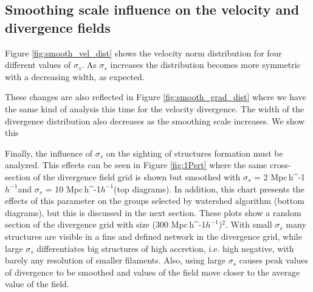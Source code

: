 \documentclass[usenatbib]{mnras}
\newcommand{\Mpch}{\,{\rm Mpc}\,\ifmmode h^{-1}\else $h^{-1}$\fi}
\begin{document}
\subsection{Smoothing scale influence on the velocity and divergence fields}
\label{VDF effects}

Figure \ref{fig:smooth_vel_dist} shows the velocity norm distribution
for four different values of $\sigma_s$. 
As $\sigma_s$ increases the distribution becomes more symmetric with a
decreasing width, as expected.

These changes are also reflected in  Figure \ref{fig:smooth_grad_dist}
where we have the same kind of analysis this time for the velocity
divergence. 
The width of the divergence distribution also decreases as the 
smoothing scale increases.
We show this 



Finally, the influence of $\sigma_s$ on the sighting of structures formation must be analyzed. This effects can be seen in Figure \ref{fig:1Pert} where the same cross-section of the divergence field grid is shown but smoothed with $\sigma_s$ = 2\,\Mpch and $\sigma_s$ = 10\,\Mpch (top diagrams). In addition, this chart presents the effects of this parameter on the groups selected by watershed algorithm (bottom diagrams), but this is discussed in the next section. These plots show a random section of the divergence grid with size (300\,\Mpch)$^2$. With small $\sigma_{s}$ many structures are visible in a fine and defined network in the divergence grid, while large $\sigma_{s}$ differentiates big structures of high accretion, i.e. high negative, with barely any resolution of smaller filaments. Also, using large $\sigma_{s}$ causes peak values of divergence to be smoothed and values of the field move closer to  the average value of the field. 
\end{document}
